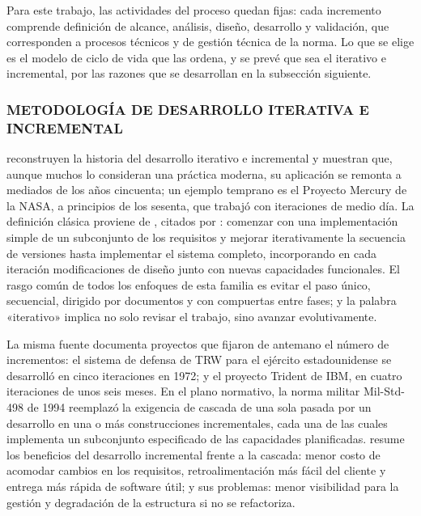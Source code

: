 Para este trabajo, las actividades del proceso quedan fijas: cada incremento comprende definición de alcance, análisis, diseño, desarrollo y validación, que corresponden a procesos técnicos y de gestión técnica de la norma. Lo que se elige es el modelo de ciclo de vida que las ordena, y se prevé que sea el iterativo e incremental, por las razones que se desarrollan en la subsección siguiente.

\subsubsection{METODOLOGÍA DE DESARROLLO ITERATIVA E INCREMENTAL}

\textcite{Larman2003} reconstruyen la historia del desarrollo iterativo e incremental y muestran que, aunque muchos lo consideran una práctica moderna, su aplicación se remonta a mediados de los años cincuenta; un ejemplo temprano es el Proyecto Mercury de la NASA, a principios de los sesenta, que trabajó con iteraciones de medio día. La definición clásica proviene de \textcite{Basili1975}, citados por \textcite{Larman2003}: comenzar con una implementación simple de un subconjunto de los requisitos y mejorar iterativamente la secuencia de versiones hasta implementar el sistema completo, incorporando en cada iteración modificaciones de diseño junto con nuevas capacidades funcionales. El rasgo común de todos los enfoques de esta familia es evitar el paso único, secuencial, dirigido por documentos y con compuertas entre fases; y la palabra «iterativo» implica no solo revisar el trabajo, sino avanzar evolutivamente.

La misma fuente documenta proyectos que fijaron de antemano el número de incrementos: el sistema de defensa de TRW para el ejército estadounidense se desarrolló en cinco iteraciones en 1972; y el proyecto Trident de IBM, en cuatro iteraciones de unos seis meses. En el plano normativo, la norma militar Mil-Std-498 de 1994 reemplazó la exigencia de cascada de una sola pasada por un desarrollo en una o más construcciones incrementales, cada una de las cuales implementa un subconjunto especificado de las capacidades planificadas. \textcite{Sommerville2016} resume los beneficios del desarrollo incremental frente a la cascada: menor costo de acomodar cambios en los requisitos, retroalimentación más fácil del cliente y entrega más rápida de software útil; y sus problemas: menor visibilidad para la gestión y degradación de la estructura si no se refactoriza.


